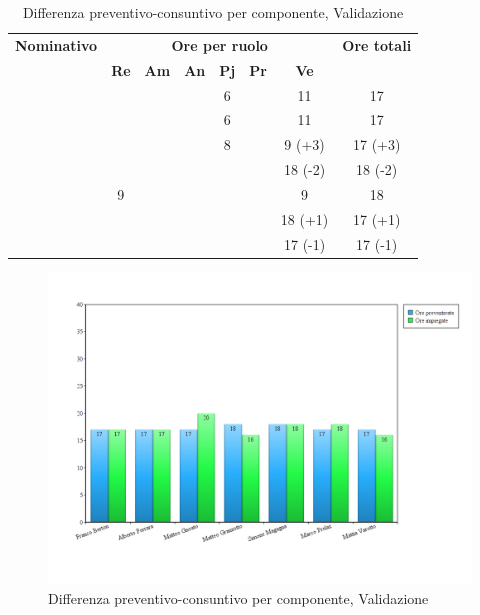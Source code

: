 \begin{table}[H]
	\begin{center}
		\begin{tabular}{|c|c|c|c|c|c|c|c|}
			\hline
			\textbf{Nominativo} & \multicolumn{6}{c|}{\textbf{Ore per ruolo}} & \textbf{Ore totali} \\
			& \textbf{Re} & \textbf{Am} & \textbf{An} & \textbf{Pj} & \textbf{Pr} & \textbf{Ve} & \\
			\hline
			\FB			&			&			&			&	6		&			&	11			&	17				\\
			\hline
			\AF			&			&			&			&	6		&			&	11			& 	17				\\
			\hline		
			\GN			&			&			&			&	8		&			&	9 (+3)		&	17 (+3)			\\
			\hline
			\GR			&			&	 		&			&			&			& 	18 (-2)		&	18 (-2)			\\
			\hline
			\SM 		&	9		&			&			&			&			& 	9			&	18				\\
			\hline
			\MP 		& 			&			&			&			&			&	18 (+1)		&	17 (+1)			\\
			\hline
			\MV 		&			&			&			&			&			&	17	(-1)	& 	17 (-1)			\\
			\hline
		\end{tabular}
	\end{center}
	\caption{Differenza preventivo-consuntivo per componente, Validazione}
\end{table}

\begin{figure}[H]
	\centering
	\includegraphics[scale=0.4]{immagini/Grafi/Validazione_oreComponente.png}
	\caption{Differenza preventivo-consuntivo per componente, Validazione}
\end{figure}
\FloatBarrier

